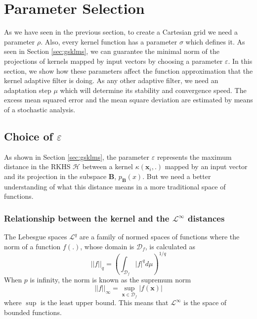 \chapter{Parameter Selection}\label{sec:choice}

As we have seen in the previous section, to create a Cartesian grid we need a parameter $\rho$. Also, every kernel function has a parameter $\sigma$ which defines it. As seen in Section \ref{sec:gsklms}, we can guarantee the minimal norm of the projections of kernels mapped by input vectors by choosing a parameter $\varepsilon$. In this section, we show how these parameters affect the function approximation that the kernel adaptive filter is doing. As any other adaptive filter, we need an adaptation step $\mu$ which will determine its stability and convergence speed. The excess mean squared error and the mean square deviation are estimated by means of a stochastic analysis.

\section{Choice of $\varepsilon$}

As shown in Section \ref{sec:gsklms}, the parameter $\varepsilon$ represents the maximum distance in the RKHS $\mathcal{H}$ between a kernel $\kappa(\mathbf{x}_i,.)$ mapped by an input vector and its projection in the subspace $\mathbf{B}$, $p_{\mathbf{B}}(x)$. But we need a better understanding of what this distance means in a more traditional space of functions.

\subsection{Relationship between the kernel and the $\mathcal{L}^\infty$ distances}

The Lebesgue spaces $\mathcal{L}^q$ are a family of normed spaces of functions where the norm of a function $f(.)$, whose domain is $\mathcal{D}_f$, is calculated as
\begin{equation}
    ||f||_{q} = \left(\int_{\mathcal{D}_f}|f|^qd\mu\right)^{1/q}
\end{equation}
When $p$ is infinity, the norm is known as the supremum norm
\begin{equation}
    ||f||_\infty = \sup_{\mathbf{x} \in \mathcal{D}_f} |f(\mathbf{x})| 
\end{equation}
where $\sup$ is the least upper bound. This means that $\mathcal{L}^{\infty}$ is the space of bounded functions.

